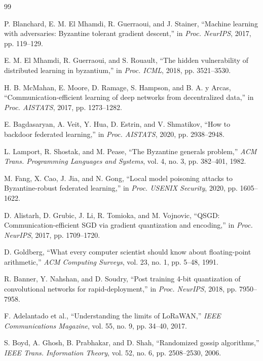 \documentclass[conference,10pt]{IEEEtran}
\begin{document}

\begin{thebibliography}{99}

P. Blanchard, E. M. El Mhamdi, R. Guerraoui, and J. Stainer, ``Machine learning with adversaries: Byzantine tolerant gradient descent,'' in \textit{Proc. NeurIPS}, 2017, pp. 119--129.

E. M. El Mhamdi, R. Guerraoui, and S. Rouault, ``The hidden vulnerability of distributed learning in byzantium,'' in \textit{Proc. ICML}, 2018, pp. 3521--3530.

H. B. McMahan, E. Moore, D. Ramage, S. Hampson, and B. A. y Arcas, ``Communication-efficient learning of deep networks from decentralized data,'' in \textit{Proc. AISTATS}, 2017, pp. 1273--1282.

E. Bagdasaryan, A. Veit, Y. Hua, D. Estrin, and V. Shmatikov, ``How to backdoor federated learning,'' in \textit{Proc. AISTATS}, 2020, pp. 2938--2948.

L. Lamport, R. Shostak, and M. Pease, ``The Byzantine generals problem,'' \textit{ACM Trans. Programming Languages and Systems}, vol. 4, no. 3, pp. 382--401, 1982.

M. Fang, X. Cao, J. Jia, and N. Gong, ``Local model poisoning attacks to Byzantine-robust federated learning,'' in \textit{Proc. USENIX Security}, 2020, pp. 1605--1622.

D. Alistarh, D. Grubic, J. Li, R. Tomioka, and M. Vojnovic, ``QSGD: Communication-efficient SGD via gradient quantization and encoding,'' in \textit{Proc. NeurIPS}, 2017, pp. 1709--1720.

D. Goldberg, ``What every computer scientist should know about floating-point arithmetic,'' \textit{ACM Computing Surveys}, vol. 23, no. 1, pp. 5--48, 1991.

R. Banner, Y. Nahshan, and D. Soudry, ``Post training 4-bit quantization of convolutional networks for rapid-deployment,'' in \textit{Proc. NeurIPS}, 2018, pp. 7950--7958.

F. Adelantado et al., ``Understanding the limits of LoRaWAN,'' \textit{IEEE Communications Magazine}, vol. 55, no. 9, pp. 34--40, 2017.

S. Boyd, A. Ghosh, B. Prabhakar, and D. Shah, ``Randomized gossip algorithms,'' \textit{IEEE Trans. Information Theory}, vol. 52, no. 6, pp. 2508--2530, 2006.


\end{thebibliography}
\end{document}
